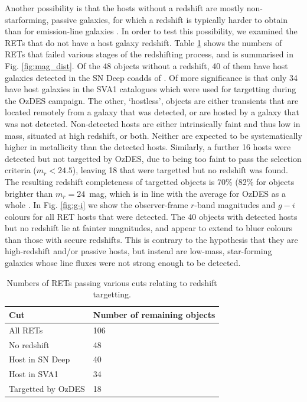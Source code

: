 \documentclass[fleqn,usenatbib,]{mnras}
\begin{document}
Another possibility is that the hosts without a redshift are mostly non-starforming, passive galaxies, for which a redshift is typically harder to obtain than for emission-line galaxies \citep{Yuan2015,Childress2017,Lidman2020}. In order to test this possibility, we examined the RETs that do not have a host galaxy redshift. Table \ref{tab:z_cuts} shows the numbers of RETs that failed various stages of the redshifting process, and is summarised in Fig. \ref{fig:mag_dist}. Of the 48 objects without a redshift, 40 of them have host galaxies detected in the SN Deep coadds of \citet{Wiseman2020}. Of more significance is that only 34 have host galaxies in the SVA1 catalogues which were used for targetting during the OzDES campaign. The other, `hostless', objects are either transients that are located remotely from a galaxy that was detected, or are hosted by a galaxy that was not detected. Non-detected hosts are either intrinsically faint and thus low in mass, situated at high redshift, or both. Neither are expected to be systematically higher in metallicity than the detected hosts. Similarly, a further 16 hosts were detected but not targetted by OzDES, due to being too faint to pass the selection criteria ($m_r < 24.5$), leaving 18 that were targetted but no redshift was found. The resulting redshift completeness of targetted objects is 70\% (82\% for objects brighter than $m_r = 24$~mag, which is in line with the average for OzDES as a whole \citep{Lidman2020}.
In Fig. \ref{fig:g-i} we show the observer-frame $r$-band magnitudes and $g-i$ colours for all RET hosts that were detected. The 40 objects with detected hosts but no redshift lie at fainter magnitudes, and appear to extend to bluer colours than those with secure redshifts. This is contrary to the hypothesis that they are high-redshift and/or passive hosts, but instead are low-mass, star-forming galaxies whose line fluxes were not strong enough to be detected.
 

\begin{table}
    \centering
    \begin{tabular}{l|l}
         Cut &  Number of remaining objects \\
        \toprule
        All RETs & 106 \\
        No redshift   & 48\\
        Host in SN Deep & 40\\
        Host in SVA1 & 34 \\
        Targetted by OzDES & 18 \\
        \bottomrule
    \end{tabular}
    \caption{Numbers of RETs passing various cuts relating to redshift targetting.}
    \label{tab:z_cuts}
\end{table}
\end{document}

